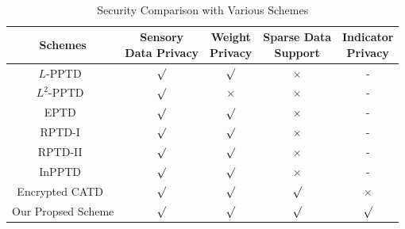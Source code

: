 \documentclass[conference]{IEEEtran}
\begin{document}
\begin{table}[htb]
  \centering
  \caption{Security Comparison with Various Schemes}~\label{tab:security}
  \linespread{1.3}\selectfont
  \begin{adjustbox}{max width=0.5\textwidth}
  \begin{tabular}{ccccc}
    \hline
    \hline
    Schemes & \makecell[c]{Sensory \\ Data Privacy} & \makecell[c]{Weight \\ Privacy} & \makecell[c]{Sparse Data \\ Support} & \makecell[c]{Indicator \\ Privacy} \\
    \hline
    $L$-PPTD~\cite{miao_lightweight_2017} & $\surd$ & $\surd$ & $\times$ & - \\
    $L^2$-PPTD~\cite{miao_lightweight_2017} & $\surd$ & $\times$ & $\times$ & - \\
    EPTD~\cite{xu_efficient_2019} & $\surd$ & $\surd$ & $\times$ & - \\
    RPTD-I~\cite{zhang_reliable_2019} & $\surd$ & $\surd$ & $\times$ & - \\
    RPTD-II~\cite{zhang_reliable_2019} & $\surd$ & $\surd$ & $\times$ & - \\
    InPPTD~\cite{xue_inpptd_2020} & $\surd$ & $\surd$ & $\times$ & - \\
    Encrypted CATD~\cite{zheng_learning_2018} & $\surd$ & $\surd$ & $\surd$ & $\times$ \\
    Our Propsed Scheme & $\surd$ & $\surd$ & $\surd$ & $\surd$ \\
    \hline
    \hline
  \end{tabular}  
  \end{adjustbox}
\end{table}

\end{document}
